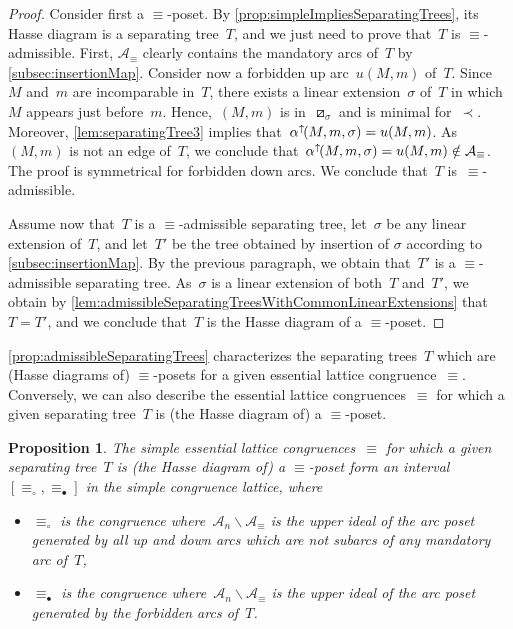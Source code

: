 \documentclass{amsart}
\newtheorem{proposition}[theorem]{Proposition}
\theoremstyle{definition}
\newcommand{\ssm}{\smallsetminus} %
\newcommand{\eqdef}{\mbox{\,\raisebox{0.2ex}{\scriptsize\ensuremath{\mathrm:}}\ensuremath{=}\,}} %
\newcommand{\darkblue}{\color{darkblue}} %
\newcommand{\defn}[1]{\textsl{\darkblue #1}} %
\newcommand{\arc}{\alpha} %
\newcommand{\arcs}{{\mathcal{A}}} %
\newcommand{\arcUp}{\smash{\alpha^{\uparrow\!}}} %
\begin{document}
\begin{proof}
Consider first a $\equiv$-poset.
By \cref{prop:simpleImpliesSeparatingTrees}, its Hasse diagram is a separating tree~$T$, and we just need to prove that~$T$ is $\equiv$-admissible.
First, $\arcs_\equiv$ clearly contains the mandatory arcs of~$T$ by \cref{subsec:insertionMap}.
Consider now a forbidden up arc~$u(M,m)$ of~$T$.
Since~$M$ and~$m$ are incomparable in~$T$, there exists a linear extension~$\sigma$ of~$T$ in which~$M$ appears just before~$m$.
Hence,~$(M,m)$ is in~$\boxslash_\sigma$ and is minimal for~$\prec$.
Moreover, \cref{lem:separatingTree3} implies that~${\arcUp(M, m, \sigma) = u(M,m)}$.
As~$(M,m)$ is not an edge of~$T$, we conclude that~${\arcUp(M, m, \sigma) = u(M,m) \notin \arcs_\equiv}$.
The proof is symmetrical for forbidden down arcs.
We conclude that~$T$ is~$\equiv$-admissible.

Assume now that~$T$ is a $\equiv$-admissible separating tree, let~$\sigma$ be any linear extension of~$T$, and let~$T'$ be the tree obtained by insertion of $\sigma$ according to \cref{subsec:insertionMap}.
By the previous paragraph, we obtain that~$T'$ is a $\equiv$-admissible separating tree.
As~$\sigma$ is a linear extension of both~$T$ and~$T'$, we obtain by \cref{lem:admissibleSeparatingTreesWithCommonLinearExtensions} that~$T = T'$, and we conclude that~$T$ is the Hasse diagram of a $\equiv$-poset.
\end{proof}

\cref{prop:admissibleSeparatingTrees} characterizes the separating trees~$T$ which are (Hasse diagrams of) $\equiv$-posets for a given essential lattice congruence~$\equiv$.
Conversely, we can also describe the essential lattice congruences~$\equiv$ for which a given separating tree~$T$ is (the Hasse diagram of) a $\equiv$-poset.

\begin{proposition}
\label{prop:whichCongruences}
The simple essential lattice congruences~$\equiv$ for which a given separating tree~$T$ is (the Hasse diagram of) a $\equiv$-poset form an interval~$[\equiv_\circ, \equiv_\bullet]$ in the simple congruence lattice, where
\begin{itemize}
\item $\equiv_\circ$ is the congruence where~$\arcs_n \ssm \arcs_\equiv$ is the upper ideal of the arc poset generated by all up and down arcs which are not subarcs of any mandatory arc of~$T$,
\item $\equiv_\bullet$ is the congruence where~$\arcs_n \ssm \arcs_\equiv$ is the upper ideal of the arc poset generated by the forbidden arcs of~$T$.
\end{itemize}
\end{proposition}
\end{document}
